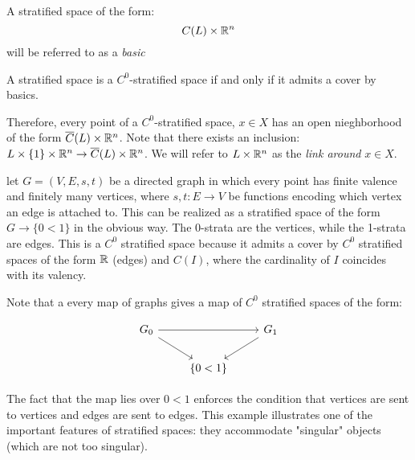 \begin{defi}
A stratified space of the form:
$$
C(L) \times \mathbb{R}^n
$$
will be referred to as a \textit{basic}
\end{defi}

\begin{rek}
    A stratified space is a $C^0$-stratified space if and only if it
    admits a cover by basics.

    Therefore, every point of a $C^0$-stratified space, $x \in X$ has an open
    nieghborhood of the form $\overline{C}(L)\times \mathbb{R}^n$. Note that there
    exists an inclusion: $ L \times \{1\}\times \mathbb{R}^n \rightarrow
    \overline{C}(L)\times \mathbb{R}^n$. We will refer to $L\times \mathbb{R}^n$ as the
    \textit{ link around }$x\in X$.
\end{rek} 

\begin{ex}
    let $G = (V, E, s, t)$ be a directed graph in which every point has finite
    valence and finitely many vertices, where $s, t: E \rightarrow V$ be
    functions encoding which vertex an edge is attached to. This can be
    realized as a stratified space of the form $G \rightarrow \{0 < 1 \} $ in
    the obvious way. The 0-strata are the vertices, while the 1-strata are
    edges. This is a $C^0$ stratified space because it admits a cover by $C^0$
    stratified spaces of the form $\mathbb{R}$ (edges) and $C(I)$, where the
    cardinality of $I$ coincides with its valency.

    Note that a every map of graphs gives a map of $C^0$ stratified spaces of
    the form: 

    $$
    \begin{tikzcd}
    G_0 \arrow[rd] \arrow[rr] &           & G_1 \arrow[ld] \\
                              & \{0 < 1\} &               
    \end{tikzcd}
    $$

    The fact that the map lies over ${0 < 1}$ enforces the condition that vertices
    are sent to vertices and edges are sent to edges. This example illustrates
    one of the important features of stratified spaces: they accommodate
    "singular" objects (which are not too singular). 
\end{ex}
